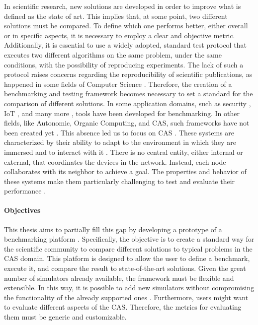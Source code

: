 \documentclass[12pt,a4paper,openright,twoside]{book}
\begin{document}
In scientific research, new solutions are developed in order to improve what is defined as the state of art. 
This implies that, at some point, two different solutions must be compared. 
To define which one performs better, either overall or in specific aspects, it is necessary to employ a clear and objective metric. 
Additionally, it is essential to use a widely adopted, standard test protocol that executes two different algorithms on the same problem, under the same conditions, with the possibility of reproducing experiments. 
The lack of such a protocol raises concerns regarding the reproducibility of scientific publications, as happened in some fields of Computer Science \cite{DBLP:journals/cacm/CollbergP16, DBLP:conf/aaai/GundersenK18}.
Therefore, the creation of a benchmarking and testing framework becomes necessary to set a standard for the comparison of different solutions.
In some application domains, such as security \cite{DBLP:conf/bdet/Es-SamaaliOBMK21}, IoT \cite{DBLP:conf/IEEEares/RuckGWLN23}, and many more \cite{DBLP:journals/ral/CollinsRYSJP24, DBLP:journals/corr/abs-2401-01275}, tools have been developed for benchmarking. 
In other fields, like Autonomic, Organic Computing, and \ac*{CAS}, such frameworks have not been created yet \cite{DBLP:conf/icac/BrownHHLLSY04, DBLP:conf/autonomics/EtcheversCV09}.
This absence led us to focus on \ac*{CAS} \cite{DBLP:journals/sttt/NicolaJW20}. 
These systems are characterized by their ability to adapt to the environment in which they are immersed and to interact with it \cite{DBLP:conf/birthday/BucchiaroneM19}.
There is no central entity, either internal or external, that coordinates the devices in the network. Instead, each node collaborates with its neighbor to achieve a goal.
The properties and behavior of these systems make them particularly challenging to test and evaluate their performance \cite{DBLP:conf/srds/AlmeidaMV10}.

\paragraph{Objectives}
This thesis aims to partially fill this gap by developing a prototype of a benchmarking platform \cite{DBLP:conf/cisis/VilenicaL12, DBLP:conf/atal/ZhangZWBR20}.
Specifically, the objective is to create a standard way for the scientific community to compare different solutions to typical problems in the \ac*{CAS} domain.
This platform is designed to allow the user to define a benchmark, execute it, and compare the result to state-of-the-art solutions.
Given the great number of simulators already available, the framework must be flexible and extensible.
In this way, it is possible to add new simulators without compromising the functionality of the already supported ones \cite{DBLP:conf/mascots/Dujmovic99}.
Furthermore, users might want to evaluate different aspects of the \ac*{CAS}. Therefore, the metrics for evaluating them must be generic and customizable.
\end{document}
